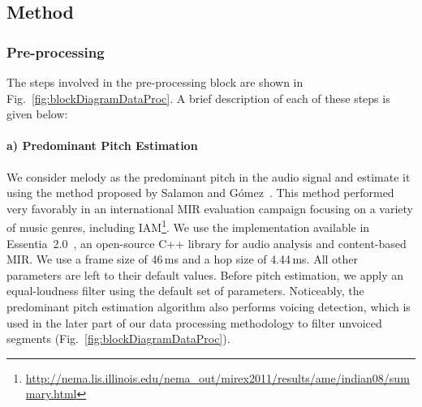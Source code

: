 \subsection{Method}


\subsubsection{Pre-processing}
\label{sec:preprocessing}



The steps involved in the pre-processing block are shown in Fig.~\ref{fig:blockDiagramDataProc}. A brief description of each of these steps is given below:

\paragraph{a) Predominant Pitch Estimation} We consider melody as the predominant pitch in the audio signal and estimate it using the method proposed by Salamon and G\'omez~\cite{Salamon2012}. This method performed very favorably in an international MIR evaluation campaign focusing on a variety of music genres, including IAM\footnote{\url{http://nema.lis.illinois.edu/nema_out/mirex2011/results/ame/indian08/summary.html}}. We use the implementation available in Essentia~2.0~\cite{essentia}, an open-source C++ library for audio analysis and content-based MIR. We use a frame size of 46\,ms and a hop size of 4.44\,ms. All other parameters are left to their default values. Before pitch estimation, we apply an equal-loudness filter using the default set of parameters. Noticeably, the predominant pitch estimation algorithm also performs voicing detection, which is used in the later part of our data processing methodology to filter unvoiced segments (Fig.~\ref{fig:blockDiagramDataProc}).%



